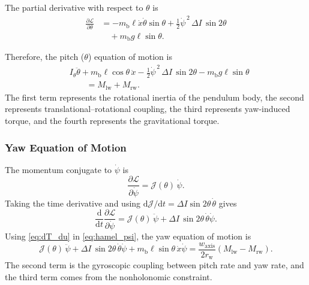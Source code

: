 \documentclass[journal]{IEEEtran}
\begin{document}
The partial derivative with respect to $\theta$ is
\begin{align}
    \frac{\partial \mathcal{L}}
    {\partial \theta}
    &=
    -m_{\mathrm b}\ell
    \dot{x}\dot{\theta}\sin\theta
    +
    \frac{1}{2}\dot{\psi}^{\,2}\,
    \Delta I\,\sin2\theta
    \nonumber\\
    &\quad
    +
    m_{\mathrm b}g\ell\sin\theta.
    \label{eq:partial_L_partial_theta}
\end{align}

Therefore, the pitch ($\theta$) equation of motion is
\begin{align}
    &I_{\theta}
    \ddot{\theta}
    +
    m_{\mathrm b}\ell
    \cos\theta\,\ddot{x}
    -
    \frac{1}{2}\dot{\psi}^{\,2}\,
    \Delta I\,\sin2\theta
    -
    m_{\mathrm b}g\ell\sin\theta
    \nonumber\\
    &\qquad
    =
    M_{\mathrm{lw}} + M_{\mathrm{rw}}.
    \label{eq:angular_eom}
\end{align}
The first term represents the rotational inertia of the pendulum body, the
second represents translational--rotational coupling, the third represents
yaw-induced torque, and the fourth represents the gravitational torque.

\subsubsection{Yaw Equation of Motion}

The momentum conjugate to $\dot\psi$ is
\begin{equation}
    \frac{\partial \mathcal{L}}{\partial \dot{\psi}}
    =
    \mathcal{J}(\theta)\,\dot{\psi}.
\end{equation}
Taking the time derivative and using $\mathrm{d}\mathcal{J}/\mathrm{d}t=\Delta I\sin2\theta\,\dot\theta$ gives
\begin{equation}
    \frac{\mathrm{d}}{\mathrm{d}t}\frac{\partial \mathcal{L}}{\partial \dot{\psi}}
    =
    \mathcal{J}(\theta)\,\ddot{\psi}
    +
    \Delta I\,\sin2\theta\,\dot{\theta}\dot{\psi}.
\end{equation}
Using \eqref{eq:dT_du} in \eqref{eq:hamel_psi}, the yaw equation of motion is
\begin{equation}
    \mathcal{J}(\theta)\,\ddot{\psi}
    +
    \Delta I\,\sin2\theta\,\dot{\theta}\dot{\psi}
    +
    m_{\mathrm b}\ell\sin\theta\,\dot{x}\dot{\psi}
    =
    \frac{w_{\mathrm{axis}}}{2r_{\mathrm w}}
    \left(
        M_{\mathrm{lw}}
        -
        M_{\mathrm{rw}}
    \right).
    \label{eq:yaw_eom}
\end{equation}
The second term is the gyroscopic coupling between pitch rate and yaw rate,
and the third term comes from the nonholonomic constraint.
\end{document}
